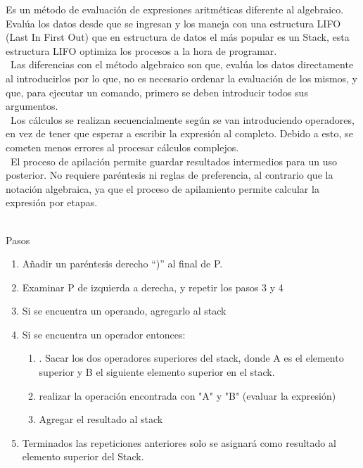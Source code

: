 \documentclass{report}
\begin{document}
Es un método de evaluación de expresiones aritméticas diferente al algebraico. Evalúa los datos desde que se ingresan y los maneja con una estructura LIFO (Last In First Out) que en estructura de datos el más popular es un Stack, esta estructura LIFO optimiza los procesos a la hora de programar.\\\
Las diferencias con el método algebraico son que, evalúa los datos directamente al introducirlos por lo que, no es necesario ordenar la evaluación de los mismos, y que, para ejecutar un comando, primero se deben introducir todos sus argumentos.\\\
Los cálculos se realizan secuencialmente según se van introduciendo operadores, en vez de tener que esperar a escribir la expresión al completo. Debido a esto, se cometen menos errores al procesar cálculos complejos.\\\
El proceso de apilación permite guardar resultados intermedios para un uso posterior. 
No requiere paréntesis ni reglas de preferencia, al contrario que la notación algebraica, ya que el proceso de apilamiento permite calcular la expresión por etapas.\\\

Pasos\
\begin{enumerate}
    \item Añadir un paréntesis derecho “)” al final de P.
    \item Examinar P de izquierda a derecha, y repetir los pasos 3 y 4
    \item Si se encuentra un operando, agregarlo al stack
    \item Si se encuentra un operador entonces:
    \begin{enumerate}
        \item . Sacar los dos operadores superiores del stack, donde A es el elemento superior y B el siguiente elemento superior en el stack.
        \item realizar la operación encontrada con "A" y "B" (evaluar la expresión)
        \item Agregar el resultado al stack
    \end{enumerate}
    \item Terminados las repeticiones anteriores solo se asignará como resultado al elemento superior del Stack.
\end{enumerate}
\end{document}
